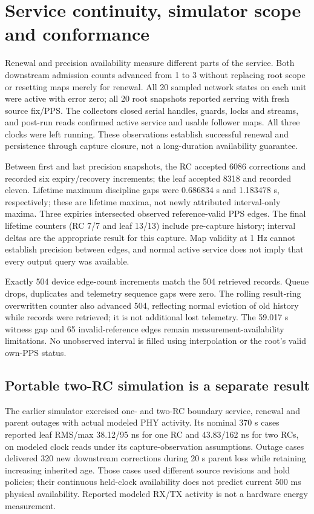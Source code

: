\documentclass[11pt,letterpaper]{article}
\begin{document}
\section{Service continuity, simulator scope and conformance}\label{sec:availability}
Renewal and precision availability measure different parts of the service. Both downstream admission counts advanced from 1 to 3 without replacing root scope or resetting maps merely for renewal. All 20 sampled network states on each unit were active with error zero; all 20 root snapshots reported serving with fresh source fix/PPS. The collectors closed serial handles, guards, locks and streams, and post-run reads confirmed active service and usable follower maps. All three clocks were left running. These observations establish successful renewal and persistence through capture closure, not a long-duration availability guarantee.

Between first and last precision snapshots, the RC accepted 6086 corrections and recorded six expiry/recovery increments; the leaf accepted 8318 and recorded eleven. Lifetime maximum discipline gaps were 0.686834 s and 1.183478 s, respectively; these are lifetime maxima, not newly attributed interval-only maxima. Three expiries intersected observed reference-valid PPS edges. The final lifetime counters (RC 7/7 and leaf 13/13) include pre-capture history; interval deltas are the appropriate result for this capture. Map validity at 1 Hz cannot establish precision between edges, and normal active service does not imply that every output query was available.

Exactly 504 device edge-count increments match the 504 retrieved records. Queue drops, duplicates and telemetry sequence gaps were zero. The rolling result-ring overwritten counter also advanced 504, reflecting normal eviction of old history while records were retrieved; it is not additional lost telemetry. The 59.017 s witness gap and 65 invalid-reference edges remain measurement-availability limitations. No unobserved interval is filled using interpolation or the root's valid own-PPS status.

\subsection{Portable two-RC simulation is a separate result}
The earlier simulator exercised one- and two-RC boundary service, renewal and parent outages with actual modeled PHY activity. Its nominal 370 s cases reported leaf RMS/max 38.12/95 ns for one RC and 43.83/162 ns for two RCs, on modeled clock reads under its capture-observation assumptions. Outage cases delivered 320 new downstream corrections during 20 s parent loss while retaining increasing inherited age. Those cases used different source revisions and hold policies; their continuous held-clock availability does not predict current 500 ms physical availability. Reported modeled RX/TX activity is not a hardware energy measurement.
\end{document}
